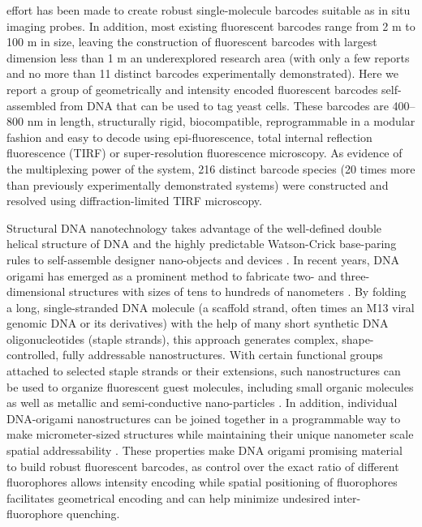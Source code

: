 effort has been made to create robust single-molecule barcodes suitable as in situ imaging 
probes. In addition, most existing fluorescent barcodes range from 2 \textmu m to 100 \textmu m in 
size, leaving the construction of fluorescent barcodes with largest dimension less than 1 
\textmu m an underexplored research area (with only a few reports  \citep{li_multiplexed_2005,lin_self-assembled_2007,li_controlled_2010,levsky_single-cell_2002} and no more than 11 
distinct barcodes experimentally demonstrated). Here we report a group of geometrically and intensity 
encoded fluorescent barcodes self-assembled from DNA that can be used to tag yeast 
cells. These barcodes are 400–800 nm in length, structurally rigid, biocompatible, 
reprogrammable in a modular fashion and easy to decode using epi-fluorescence, total internal reflection fluorescence (TIRF) or 
super-resolution fluorescence microscopy. As evidence of the multiplexing power of the 
system, 216 distinct barcode species (20 times more than previously experimentally 
demonstrated systems) were constructed and resolved using diffraction-limited TIRF 
microscopy. 

Structural DNA nanotechnology takes advantage of the well-defined double 
helical structure of DNA and the highly predictable Watson-Crick base-paring rules to 
self-assemble designer nano-objects and devices \citep{seeman_nucleic_1982,aldaye_assembling_2008,lin_designer_2009,nangreave_dna_2010,shih_knitting_2010,trring_dna_2011}. In recent years, DNA origami has 
emerged as a prominent method to fabricate two- and three-dimensional structures with 
sizes of tens to hundreds of nanometers \citep{rothemund_folding_2006,douglas_self-assembly_2009,dietz_folding_2009,ke_multilayer_2009,andersen_self-assembly_2009,han_folding_2010,liedl_self-assembly_2010,han_dna_2011}. By folding a long, single-stranded DNA 
molecule (a scaffold strand, often times an M13 viral genomic DNA or its derivatives) 
with the help of many short synthetic DNA oligonucleotides (staple strands), this 
approach generates complex, shape-controlled, fully addressable nanostructures. With 
certain functional groups attached to selected staple strands or their extensions, such 
nanostructures can be used to organize fluorescent guest molecules, including small 
organic molecules \citep{jungmann_single-molecule_2010,steinhauer_dna_2009,lund_molecular_2010} as well as metallic \citep{pal_dna-origami-directed_2010} and semi-conductive nano-particles \citep{bui_programmable_2010}. In 
addition, individual DNA-origami nanostructures can be joined together in a 
programmable way to make micrometer-sized structures while maintaining their unique 
nanometer scale spatial addressability \citep{liu_crystalline_2011,woo_programmable_2011}. These properties make DNA origami 
promising material to build robust fluorescent barcodes, as control over the exact ratio of 
different fluorophores allows intensity encoding while spatial positioning of fluorophores 
facilitates geometrical encoding and can help minimize undesired inter-fluorophore 
quenching. 








